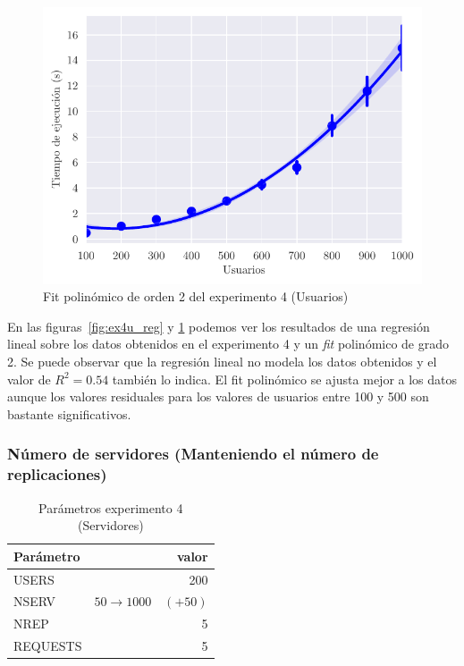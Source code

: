 \begin{figure}[H]
    \centering
    \includegraphics{include/plots/ex4u_time_reg_2.pdf}
    \caption{Fit polinómico de orden 2 del experimento 4 (Usuarios)}%
    \label{fig:ex4u_reg_poly}
\end{figure}

En las figuras~\ref{fig:ex4u_reg} y \ref{fig:ex4u_reg_poly} podemos ver los resultados de una regresión lineal
sobre los datos obtenidos en el experimento 4 y un \emph{fit} polinómico de grado 2. Se puede observar que la
regresión lineal no modela los datos obtenidos y el valor de $R^2=0.54$ también lo indica. El fit polinómico
se ajusta mejor a los datos aunque los valores residuales para los valores de usuarios entre 100 y 500 son
bastante significativos.

\subsubsection{Número de servidores (Manteniendo el número de replicaciones)}

\begin{table}[H]
    \caption{Parámetros experimento 4 (Servidores)}%
    \label{tab:ex4s_par}
    \begin{center}
    \begin{tabular}{lr}
    \toprule
    Parámetro & valor \\
    \midrule
    USERS & 200 \\
    NSERV & $50 \to 1000 \quad (+50)$ \\
    NREP & 5 \\
    REQUESTS & 5\\
    \bottomrule
    \end{tabular}
    \end{center}
\end{table}

